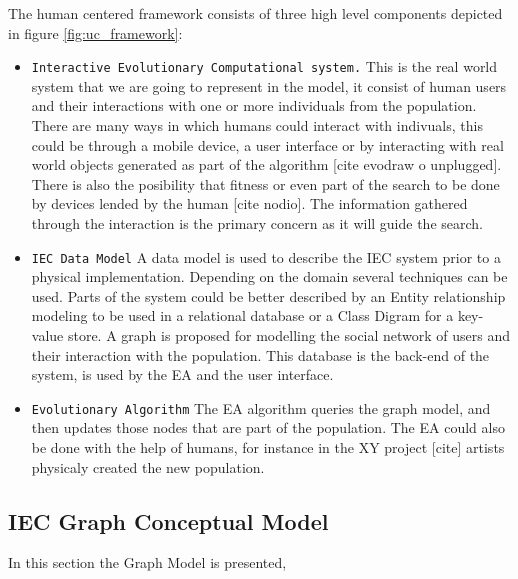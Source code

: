 \documentclass[conference]{IEEEtran}
\begin{document}
The human centered framework consists of three high level components depicted
in figure \ref{fig:uc_framework}:

\begin{itemize}
  \item { \tt Interactive Evolutionary Computational system.}  
  This is the real world system that we are going to represent in the model, 
  it consist of human users and their interactions with one or more individuals from
  the population. There are many ways in which humans could interact 
  with indivuals, this could be through a mobile device, a user interface 
  or by interacting with real world objects generated as part of the algorithm 
  [cite evodraw o unplugged].
  There is also the posibility that fitness or even part of the search 
  to be done by devices lended by the human [cite nodio].
  The information gathered through the interaction is the primary concern
  as it will guide the search. 

  \item {\tt IEC Data Model}
  A data model is used to describe the IEC system prior to a physical 
  implementation. 
  Depending on the domain several techniques can be used.
  Parts of the system could be better described by an Entity relationship 
  modeling to be used in a relational database or a Class Digram for a 
  key-value store. 
  A graph is proposed for modelling the social network
  of users and their interaction with the population. This database 
  is the back-end of the system, is used by the EA and the user interface. 

  \item {\tt Evolutionary Algorithm} 
  The EA algorithm queries the graph model, and then updates those nodes that 
  are part of the population. The EA could also be done with the help of
  humans, for instance in the XY project [cite] artists physicaly created
  the new population.  
\end{itemize}

  



\subsection{IEC Graph Conceptual Model} 

In this section the Graph Model is presented, 
\end{document}
